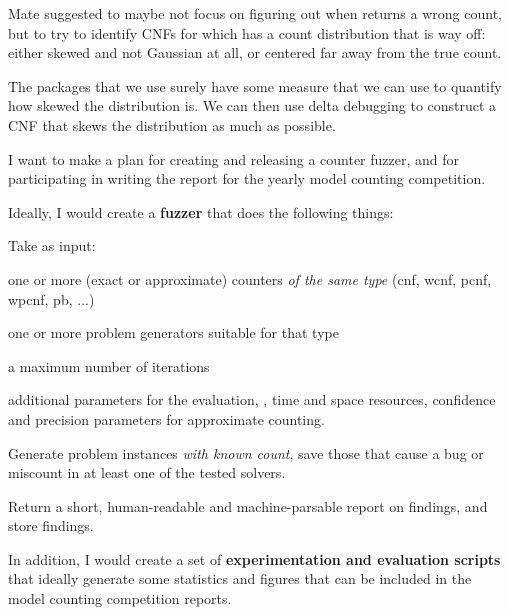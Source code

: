 \documentclass[a4paper]{tufte-handout}
\begin{document}
	\noindent\hrulefill
	
	
	
	
	Mate suggested to maybe not focus on figuring out when \approxmc{} returns a wrong count, but to try to identify CNFs for which \approxmc{} has a count distribution that is way off: either skewed and not Gaussian at all, or centered far away from the true count.
	
	The \python{} packages that we use surely have some measure that we can use to quantify how skewed the distribution is.
	We can then use delta debugging to construct a CNF that skews the distribution as much as possible.

		
	\noindent\hrulefill
	
	
	
	
	I want to make a plan for creating and releasing a counter fuzzer, and for participating in writing the report for the yearly model counting competition.

	Ideally, I would create a {\bf fuzzer} that does the following things:

	\begin{compactitem}
		\item Take as input:
			\begin{compactitem}
				\item one or more (exact or approximate) counters {\em of the same type} (cnf, wcnf, pcnf, wpcnf, pb, ...)
				\item one or more problem generators suitable for that type
				\item a maximum number of iterations
				\item additional parameters for the evaluation, \eg{}, time and space resources, confidence and precision parameters for approximate counting.
			\end{compactitem}
		\item Generate problem instances {\em with known count}, save those that cause a bug or miscount in at least one of the tested solvers.
		\item Return a short, human-readable and machine-parsable report on findings, and store findings.
	\end{compactitem}

	In addition, I would create a set of {\bf experimentation and evaluation scripts} that ideally generate some statistics and figures that can be included in the model counting competition reports.
\end{document}
